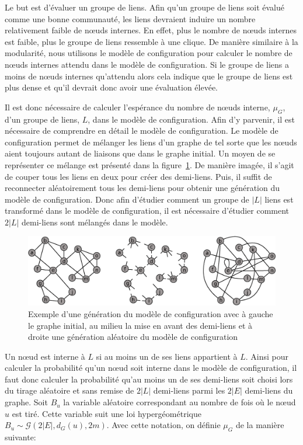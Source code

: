 Le but est d'évaluer un groupe de liens.
Afin qu'un groupe de liens soit évalué comme une bonne communauté, les liens devraient induire un nombre relativement faible de n\oe{}uds internes.
En effet, plus le nombre de n\oe{}uds internes est faible, plus le groupe de liens ressemble à une clique.
De manière similaire à la modularité, nous utilisons le modèle de configuration pour calculer le nombre de n\oe{}uds internes attendu dans le modèle de configuration.
Si le groupe de liens a moins de n\oe{}uds internes qu'attendu alors cela indique que le groupe de liens est plus dense et qu'il devrait donc avoir une évaluation élevée.


Il est donc nécessaire de calculer l'espérance du nombre de n\oe{}uds interne, $\mu_{G}$, d'un groupe de liens, $L$, dans le modèle de configuration.
Afin d'y parvenir, il est nécessaire de comprendre en détail le modèle de configuration.
Le modèle de configuration permet de mélanger les liens d'un graphe de tel sorte que les n\oe{}uds aient toujours autant de liaisons que dans le graphe initial.
Un moyen de se représenter ce mélange est présenté dans la figure~\ref{fig:exemple_modele_configuration}.
De manière imagée, il s'agit de couper tous les liens en deux pour créer des demi-liens.
Puis, il suffit de reconnecter aléatoirement tous les demi-liens pour obtenir une génération du modèle de configuration.
Donc afin d'étudier comment un groupe de $|L|$ liens est transformé dans le modèle de configuration, il est nécessaire d'étudier comment $2|L|$ demi-liens sont mélangés dans le modèle.

\begin{figure}
\centering
\includegraphics[width=0.8\linewidth]{img/ExpectedNodes/Example/modele_configuration.eps}
\caption{Exemple d'une génération du modèle de configuration avec à gauche le graphe initial, au milieu la mise en avant des demi-liens et à droite une génération aléatoire du modèle de configuration}
\label{fig:exemple_modele_configuration}
\end{figure}


Un n\oe{}ud est interne à $L$ si au moins un de ses liens appartient à $L$.
Ainsi pour calculer la probabilité qu'un n\oe{}ud soit interne dans le modèle de configuration, il faut donc calculer la probabilité qu'au moins un de ses demi-liens soit choisi lors du tirage aléatoire et sans remise de $2|L|$ demi-liens parmi les $2|E|$ demi-liens du graphe.
Soit $B_u$ la variable aléatoire correspondant au nombre de fois où le n\oe{}ud $u$ est tiré.
Cette variable suit une loi  hypergéométrique $B_u \sim \mathcal{G}\left(2|E|,d_G(u),2m\right)$.
Avec cette notation, on définie $\mu_G$ de la manière suivante:

